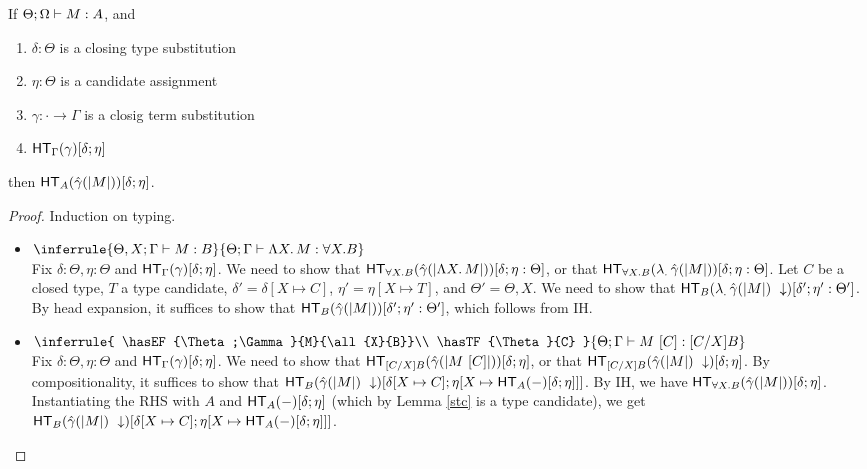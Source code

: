 \documentclass{article}
\begin{document}
\begin{theorem}
If $\Theta;\Omega \vdash M : A$, and 
\begin{enumerate}
\item $\delta : \Theta$ is a closing type substitution 
\item $\eta : \Theta$ is a candidate assignment 
\item $\gamma : \cdot \to \Gamma$ is a closig term substitution
\item $\mathsf{HT}_{\Gamma}(\gamma)[\delta;\eta]$
\end{enumerate}
then $\mathsf{HT}_{A}(\hat\gamma(|M|))[\delta;\eta]$.
\end{theorem}

\begin{proof}
Induction on typing.
\begin{itemize}
\setlength\itemsep{1em}
\item $\inferrule{
  \hasEF{\Theta, X; \Gamma}{M}{B}
  }{
  \hasEF{\Theta; \Gamma}{\tlam{X}{M}}{\all{X}{B}}
  }$\\
Fix $\delta : \Theta, \eta : \Theta$ and $\mathsf{HT}_{\Gamma}(\gamma)[\delta;\eta]$. We need to show that 
$\mathsf{HT}_{\forall X. B}(\hat\gamma(|\Lambda X.\, M|))[\delta;\eta : \Theta]$, or that
$\mathsf{HT}_{\forall X. B}(\lambda _.\, \hat\gamma(|M|))[\delta;\eta : \Theta]$.
Let $C$ be a closed type, $T$ a type candidate, 
$\delta' = \delta[X \mapsto C]$, $\eta' = \eta[X \mapsto T]$, and $\Theta' = \Theta,X$. 
We need to show that $\mathsf{HT}_{B}(\lambda _.\, \hat\gamma(|M|)\ \downarrow)[\delta';\eta' : \Theta']$. 
By head expansion, it suffices to show
that $\mathsf{HT}_{B}(\hat\gamma(|M|))[\delta';\eta' : \Theta']$, which follows from IH. 

\item $\inferrule{
  \hasEF{\Theta;\Gamma}{M}{\all{X}{B}}\\
  \hasTF{\Theta}{C}
  }{
  \hasEF{\Theta;\Gamma}{\tap{M}{C}}{[C/X]B}
  }$\\
Fix $\delta : \Theta, \eta : \Theta$ and $\mathsf{HT}_{\Gamma}(\gamma)[\delta;\eta]$. We need to show that 
$\mathsf{HT}_{[C/X]B}(\hat\gamma(|M\ [C]|))[\delta;\eta]$, or that
$\mathsf{HT}_{[C/X]B}(\hat\gamma(|M|)\ \downarrow)[\delta;\eta]$. By compositionality, it suffices to show that
$\mathsf{HT}_{B}(\hat\gamma(|M|)\ \downarrow)[\delta[X \mapsto C];\eta[X \mapsto \mathsf{HT}_{A}(-)[\delta;\eta]]]$.
By IH, we have $\mathsf{HT}_{\forall X. B}(\hat\gamma(|M|))[\delta;\eta]$. Instantiating the RHS with $A$ and 
$\mathsf{HT}_{A}(-)[\delta;\eta]$ (which by Lemma \ref{stc} is a type candidate), we get
$\mathsf{HT}_{B}(\hat\gamma(|M|)\ \downarrow)[\delta[X \mapsto C];\eta[X \mapsto \mathsf{HT}_{A}(-)[\delta;\eta]]]$.
\end{itemize}
\end{proof}
\end{document}
